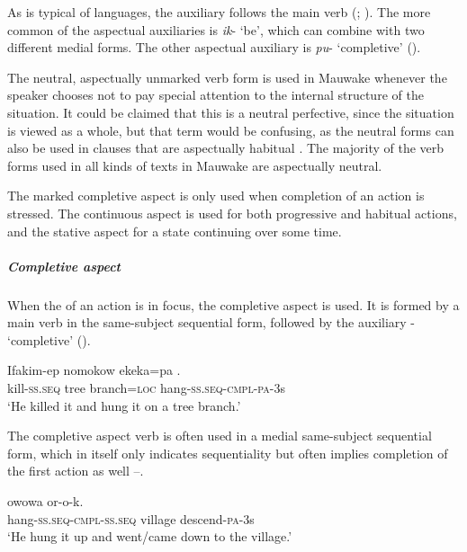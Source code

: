  As is typical of  languages, the auxiliary follows the main verb (\citealt[85]{Greenberg1966}; \citealt[90]{Dryer2007a}). The more common of the aspectual auxiliaries is \textit{ik}- `be', which can combine with two different medial forms. The other aspectual auxiliary is \textit{pu}- `completive' (). 

The neutral, aspectually unmarked verb form is used in Mauwake whenever the speak\-er chooses not to pay special attention to the internal structure of the situation. It could be claimed that this is a neutral perfective, since the situation is viewed as a whole, but that term would be confusing, as the neutral forms can also be used in clauses that are aspectually habitual \citep[cf.][239]{Payne1997}. The majority of the verb forms used in all kinds of texts in Mauwake are aspectually neutral.

The marked completive aspect is only used when completion of an action is stressed. The continuous aspect is used for both progressive and habitual actions, and the stative aspect for a state continuing over some time.

\subparagraph{Completive aspect}\label{sec:3.8.5.1.1.1}

When the  of an action is in focus, the completive aspect is used. It is formed by a main verb in the same-subject sequential form, followed by the auxiliary - `completive'   ().

\ea%
\label{ex:3:x361}
\gll Ifakim-ep nomokow ekeka=pa . \\
kill-\textsc{ss}.\textsc{seq} tree branch=\textsc{loc} hang-\textsc{ss}.\textsc{seq}-\textsc{cmpl}-\textsc{pa}-3s \\
\glt`He killed it and hung it on a tree branch.'
\z

The completive aspect verb is often used in a medial same-subject sequential form, which in itself only indicates sequentiality but often implies completion of the first action as well  --. 

\ea%
\label{ex:3:x362}
\gll {} owowa or-o-k. \\
hang-\textsc{ss}.\textsc{seq}-\textsc{cmpl}-\textsc{ss}.\textsc{seq} village descend-\textsc{pa}-3s\\
\glt`He hung it up and went/came down to the village.'
\z

